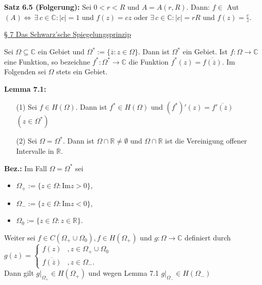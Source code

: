 \documentclass[11pt]{article}
\newcommand{\C}{\mathbb{C}}
\newcommand{\R}{\mathbb{R}}
\begin{document}
\textbf{Satz 6.5 (Folgerung):} Sei $0 < r < R$ und $A = A(r,R)$. Dann: $f \in$ Aut$(A) \Leftrightarrow \, \exists \, c \in \C \colon |c| = 1$ und $f(z) = cz$ oder $\exists \, c \in \C \colon |c| = rR$ und $f(z) = \frac{c}{z}$. 

\underline{§ 7 Das Schwarz'sche Spiegelungsprinzip}

Sei $\Omega \subseteq \C$ ein Gebiet und $\Omega^* := \{ \overline{z} \colon z \in \Omega \}$. Dann ist $\Omega^*$ ein Gebiet. Ist $f \colon \Omega \to \C$ eine Funktion, so bezeichne $f^*\colon \Omega^* \to \C$ die Funktion $f^*(z) = \overline{f(\overline{z})}$. Im Folgenden sei $\Omega$ stets ein Gebiet.

\textbf{Lemma 7.1:}
\vspace{-0.6cm}  
\begin{itemize}
\item[(1)] Sei $f \in H(\Omega)$. Dann ist $f^* \in H(\Omega)$ und $(f^*)'(z) = \overline{f'(\overline{z})}$ $(z \in \Omega^*)$ \vspace{-0.2cm}
\item[(2)] Sei $\Omega = \Omega^*$. Dann ist $\Omega \cap \R \neq \emptyset$ und $\Omega \cap \R$ ist die Vereinigung offener Intervalle in $\R$.
\end{itemize}
\vspace{-0.3cm}

\textbf{Bez.:} Im Fall $\Omega = \Omega^*$ sei 
\vspace{-0.6cm}
\begin{itemize}
\item $\Omega_+ := \{ z \in \Omega \colon \text{Im} z > 0 \}$, \vspace{-0.2cm}
\item $\Omega_- := \{ z \in \Omega \colon \text{Im} z < 0 \}$, \vspace{-0.2cm}
\item $\Omega_0 := \{ z \in \Omega \colon z \in \R \}$.
\end{itemize}
\vspace{-0.3cm}

Weiter sei $f \in C(\Omega_+ \cup \Omega_0), f \in H(\Omega_+)$ und $g \colon \Omega \to \C$ definiert durch \\
$ g(z) =
  \begin{cases} 
f(z) &, z \in \Omega_+ \cup \Omega_0 \\ 
\overline{f(\overline{z})} &, z \in \Omega_-.
\end{cases}
$ \\
Dann gilt $g|_{\Omega_+} \in H(\Omega_+)$ und wegen Lemma 7.1 $g|_{\Omega_-} \in H(\Omega_-)$
\end{document}
